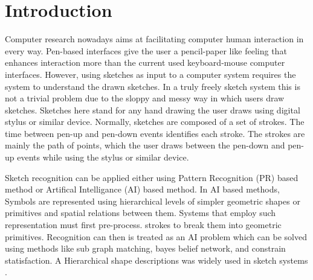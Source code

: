 \documentclass[preprint,10pt,5p,twocolumn]{elsarticle}
\begin{document}
\section{Introduction}

Computer research nowadays aims at facilitating computer human interaction in every way. Pen-based interfaces give the user a pencil-paper like feeling that enhances interaction more than the current used keyboard-mouse computer interfaces. However, using sketches as input to a computer system requires the system to understand the drawn sketches. In a truly freely sketch system this is not a trivial problem due to the sloppy and messy  way in which users draw sketches. Sketches here stand for any hand drawing the user draws using digital stylus or similar device. Normally, sketches are composed of a set of strokes. The time between pen-up and pen-down events identifies each stroke. The strokes are mainly the path of points, which the user draws between the pen-down and pen-up events while using the stylus or similar device. 

Sketch recognition can be applied either using  Pattern Recognition (PR) based method or Artifical Intelligance (AI) based method. In AI based methods, Symbols are represented using hierarchical levels of simpler geometric shapes or primitives and spatial relations between them. Systems that employ such representation must first pre-process. strokes to break them into geometric primitives. Recognition can then is treated as an AI problem which can be solved using methods like sub graph matching, bayes belief network, and constrain statisfaction. A Hierarchical shape descriptions was widely used in sketch systems \cite{HierarchicalParsing7,SketchRead2007}.  %
\end{document}
